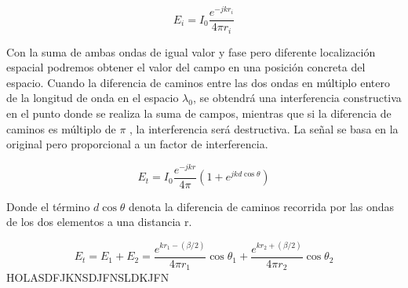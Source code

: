 \begin{equation}
	E_{i}=I_{0}\frac{e^{-jkr_{i}}}{4\pi r_{i}}
	\label{eq:ei}
\end{equation}


\par Con la suma de ambas ondas de igual valor y fase pero diferente localización espacial podremos obtener el valor del campo en una posición concreta del espacio. Cuando la diferencia de caminos entre las dos ondas en múltiplo entero de la longitud de onda en el espacio \textit{$\lambda _{0}$}, se obtendrá una interferencia constructiva en el punto donde se realiza la suma de campos, mientras que si la diferencia de caminos es múltiplo de $\pi$ , la interferencia será destructiva. La señal se basa en la original pero proporcional a un factor de interferencia.

\begin{equation}
	E_{t}=I_{0}\frac{e^{-jkr}}{4\pi}(1+e^{jkd\cos\theta })
	\label{eq:einter}
\end{equation}

Donde el término $d\cos\theta$ denota la diferencia de caminos recorrida por las ondas de los dos elementos a una distancia r.

\begin{equation}
	E_{t}=E_{1}+E_{2}=\frac{    e^{kr_{1}-(\beta/2)} }{ 4\pi r_{1}  }\cos\theta _{1}+\frac{    e^{kr_{2}+(\beta/2)} }{ 4\pi r_{2}  }\cos\theta _{2}
	\label{eq:ei}
\end{equation}
HOLASDFJKNSDJFNSLDKJFN